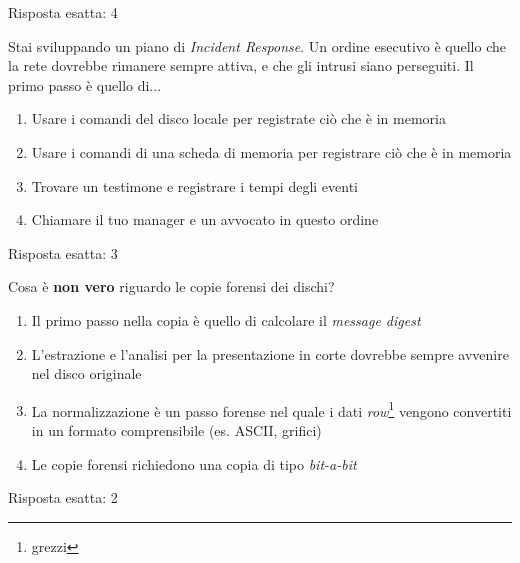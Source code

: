 \begin{Answer} [
  ref={esIRBC7},
  number={7}
  ]

  \Question Risposta esatta: 4
\end{Answer}


\begin{Exercise} [
  title={Quiz},
  label={esIRBC8}
  ]

  \Question Stai sviluppando un piano di \textit{Incident Response}. Un ordine
esecutivo \`e quello che la rete dovrebbe rimanere sempre attiva, e che gli
intrusi siano perseguiti. Il primo passo \`e quello di...
\begin{enumerate}
 \item Usare i comandi del disco locale per registrate ci\`o che \`e in memoria
 \item Usare i comandi di una scheda di memoria per registrare ci\`o che \`e in
memoria
 \item Trovare un testimone e registrare i tempi degli eventi
 \item Chiamare il tuo manager e un avvocato in questo ordine
\end{enumerate}

\end{Exercise}

\begin{Answer} [
  ref={esIRBC8},
  number={8}
  ]

  \Question Risposta esatta: 3
\end{Answer}


\begin{Exercise} [
  title={Quiz},
  label={esIRBC8}
  ]

  \Question Cosa \`e \textbf{non vero} riguardo le copie forensi dei dischi?
  \begin{enumerate}
   \item Il primo passo nella copia \`e quello di calcolare il \textit{message
digest}
   \item L'estrazione e l'analisi per la presentazione in corte dovrebbe sempre
avvenire nel disco originale
   \item La normalizzazione \`e un passo forense nel quale i dati
\textit{row}\footnote{grezzi} vengono convertiti in un formato comprensibile
(es. ASCII, grifici)
   \item Le copie forensi richiedono una copia di tipo \textit{bit-a-bit}
  \end{enumerate}
\end{Exercise}

\begin{Answer} [
  ref={esIRBC8},
  number={8}
  ]

  \Question Risposta esatta: 2
\end{Answer}

